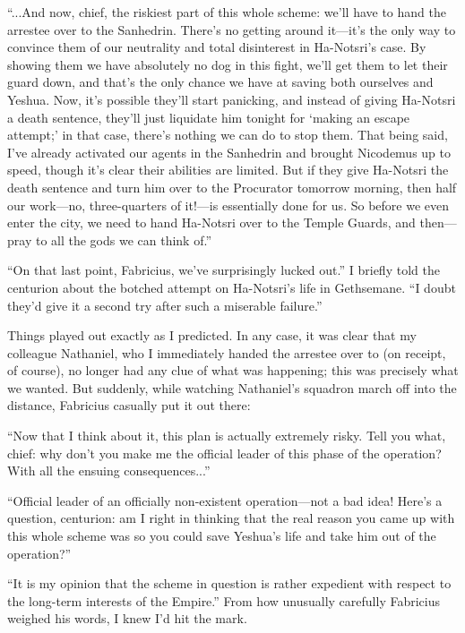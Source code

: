 ``...And now, chief, the riskiest part of this whole scheme: we'll have to hand the arrestee over to the Sanhedrin. There's no getting around it---it's the only way to convince them of our neutrality and total disinterest in Ha-Notsri's case. By showing them we have absolutely no dog in this fight, we'll get them to let their guard down, and that's the only chance we have at saving both ourselves and Yeshua. Now, it's possible they'll start panicking, and instead of giving Ha-Notsri a death sentence, they'll just liquidate him tonight for `making an escape attempt;' in that case, there's nothing we can do to stop them. That being said, I've already activated our agents in the Sanhedrin and brought Nicodemus up to speed, though it's clear their abilities are limited. But if they give Ha-Notsri the death sentence and turn him over to the Procurator tomorrow morning, then half our work---no, three-quarters of it!---is essentially done for us. So before we even enter the city, we need to hand Ha-Notsri over to the Temple Guards, and then---pray to all the gods we can think of.''

``On that last point, Fabricius, we've surprisingly lucked out.'' I briefly told the centurion about the botched attempt on Ha-Notsri's life in Gethsemane. ``I doubt they'd give it a second try after such a miserable failure.'' 

Things played out exactly as I predicted. In any case, it was clear that my colleague Nathaniel, who I immediately handed the arrestee over to (on receipt, of course), no longer had any clue of what was happening; this was precisely what we wanted. But suddenly, while watching Nathaniel's squadron march off into the distance, Fabricius casually put it out there:

``Now that I think about it, this plan is actually extremely risky. Tell you what, chief: why don't you make me the official leader of this phase of the operation? With all the ensuing consequences...''

``Official leader of an officially non-existent operation---not a bad idea! Here's a question, centurion: am I right in thinking that the real reason you came up with this whole scheme was so you could save Yeshua's life and take him out of the operation?''

``It is my opinion that the scheme in question is rather expedient with respect to the long-term interests of the Empire.'' From how unusually carefully Fabricius weighed his words, I knew I'd hit the mark.

